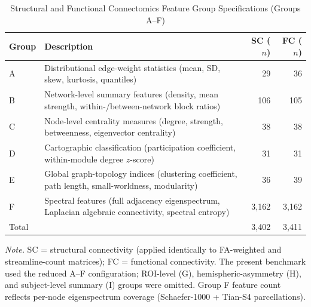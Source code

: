 \documentclass[11pt,a4paper,twoside]{article}
\begin{document}
\begin{table}[H]
\caption{Structural and Functional Connectomics Feature Group Specifications (Groups A--F)}
\label{tab:s3}
\footnotesize
\begin{tabularx}{\linewidth}{l X r r}
\toprule
Group & Description & SC ($n$) & FC ($n$) \\
\midrule
A & Distributional edge-weight statistics (mean, SD, skew, kurtosis, quantiles) & 29 & 36 \\
B & Network-level summary features (density, mean strength, within-/between-network block ratios) & 106 & 105 \\
C & Node-level centrality measures (degree, strength, betweenness, eigenvector centrality) & 38 & 38 \\
D & Cartographic classification (participation coefficient, within-module degree $z$-score) & 31 & 31 \\
E & Global graph-topology indices (clustering coefficient, path length, small-worldness, modularity) & 36 & 39 \\
F & Spectral features (full adjacency eigenspectrum, Laplacian algebraic connectivity, spectral entropy) & 3,162 & 3,162 \\
\midrule
\multicolumn{2}{l}{Total} & 3,402 & 3,411 \\
\bottomrule
\end{tabularx}
\par\smallskip\noindent\small\textit{Note.} SC = structural connectivity (applied identically to FA-weighted and streamline-count matrices); FC = functional connectivity. The present benchmark used the reduced A--F configuration; ROI-level (G), hemispheric-asymmetry (H), and subject-level summary (I) groups were omitted. Group F feature count reflects per-node eigenspectrum coverage (Schaefer-1000 + Tian-S4 parcellations).
\end{table}
\end{document}
